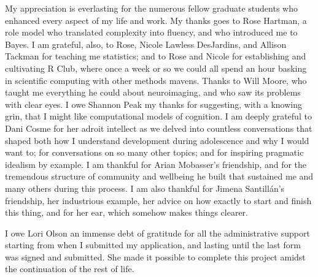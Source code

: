 My appreciation is everlasting for the numerous fellow graduate students who enhanced every aspect of my life and work.
My thanks goes to Rose Hartman, a role model who translated complexity into fluency, and who introduced me to Bayes.
I am grateful, also, to Rose, Nicole Lawless DesJardins, and Allison Tackman for teaching me statistics; and to Rose and Nicole for establishing and cultivating R Club, where once a week or so we could all spend an hour basking in scientific computing with other methods mavens.
Thanks to Will Moore, who taught me everything he could about neuroimaging, and who saw its problems with clear eyes.
I owe Shannon Peak my thanks for suggesting, with a knowing grin, that I might like computational models of cognition.
I am deeply grateful to Dani Cosme for her adroit intellect as we delved into countless conversations that shaped both how I understand development during adolescence and why I would want to; for conversations on so many other topics; and for inspiring pragmatic idealism by example.
I am thankful for Arian Mobasser's friendship, and for the tremendous structure of community and wellbeing he built that sustained me and many others during this process.
I am also thankful for Jimena Santillán's friendship, her industrious example, her advice on how exactly to start and finish this thing, and for her ear, which somehow makes things clearer.

I owe Lori Olson an immense debt of gratitude for all the administrative support starting from when I submitted my application, and lasting until the last form was signed and submitted. 
She made it possible to complete this project amidst the continuation of the rest of life.


